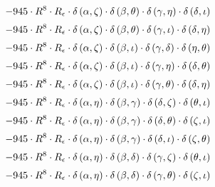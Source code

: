\begin{subequations}
\begin{gather}
 \\[0.2em] \notag 		 - 945 \cdot R^{8} \cdot R_{\epsilon{}} \cdot \delta{}\left(\alpha{}, \zeta{}\right) \cdot \delta{}\left(\beta{}, \theta{}\right) \cdot \delta{}\left(\gamma{}, \eta{}\right) \cdot \delta{}\left(\delta{}, \iota{}\right) 
 \\[0.2em] \notag 		 - 945 \cdot R^{8} \cdot R_{\epsilon{}} \cdot \delta{}\left(\alpha{}, \zeta{}\right) \cdot \delta{}\left(\beta{}, \theta{}\right) \cdot \delta{}\left(\gamma{}, \iota{}\right) \cdot \delta{}\left(\delta{}, \eta{}\right) 
 \\[0.2em] \notag 		 - 945 \cdot R^{8} \cdot R_{\epsilon{}} \cdot \delta{}\left(\alpha{}, \zeta{}\right) \cdot \delta{}\left(\beta{}, \iota{}\right) \cdot \delta{}\left(\gamma{}, \delta{}\right) \cdot \delta{}\left(\eta{}, \theta{}\right) 
 \\[0.2em] \notag 		 - 945 \cdot R^{8} \cdot R_{\epsilon{}} \cdot \delta{}\left(\alpha{}, \zeta{}\right) \cdot \delta{}\left(\beta{}, \iota{}\right) \cdot \delta{}\left(\gamma{}, \eta{}\right) \cdot \delta{}\left(\delta{}, \theta{}\right) 
 \\[0.2em] \notag 		 - 945 \cdot R^{8} \cdot R_{\epsilon{}} \cdot \delta{}\left(\alpha{}, \zeta{}\right) \cdot \delta{}\left(\beta{}, \iota{}\right) \cdot \delta{}\left(\gamma{}, \theta{}\right) \cdot \delta{}\left(\delta{}, \eta{}\right) 
 \\[0.2em] \notag 		 - 945 \cdot R^{8} \cdot R_{\epsilon{}} \cdot \delta{}\left(\alpha{}, \eta{}\right) \cdot \delta{}\left(\beta{}, \gamma{}\right) \cdot \delta{}\left(\delta{}, \zeta{}\right) \cdot \delta{}\left(\theta{}, \iota{}\right) 
 \\[0.2em] \notag 		 - 945 \cdot R^{8} \cdot R_{\epsilon{}} \cdot \delta{}\left(\alpha{}, \eta{}\right) \cdot \delta{}\left(\beta{}, \gamma{}\right) \cdot \delta{}\left(\delta{}, \theta{}\right) \cdot \delta{}\left(\zeta{}, \iota{}\right) 
 \\[0.2em] \notag 		 - 945 \cdot R^{8} \cdot R_{\epsilon{}} \cdot \delta{}\left(\alpha{}, \eta{}\right) \cdot \delta{}\left(\beta{}, \gamma{}\right) \cdot \delta{}\left(\delta{}, \iota{}\right) \cdot \delta{}\left(\zeta{}, \theta{}\right) 
 \\[0.2em] \notag 		 - 945 \cdot R^{8} \cdot R_{\epsilon{}} \cdot \delta{}\left(\alpha{}, \eta{}\right) \cdot \delta{}\left(\beta{}, \delta{}\right) \cdot \delta{}\left(\gamma{}, \zeta{}\right) \cdot \delta{}\left(\theta{}, \iota{}\right) 
 \\[0.2em] \notag 		 - 945 \cdot R^{8} \cdot R_{\epsilon{}} \cdot \delta{}\left(\alpha{}, \eta{}\right) \cdot \delta{}\left(\beta{}, \delta{}\right) \cdot \delta{}\left(\gamma{}, \theta{}\right) \cdot \delta{}\left(\zeta{}, \iota{}\right) 

\end{gather}
\end{subequations}
